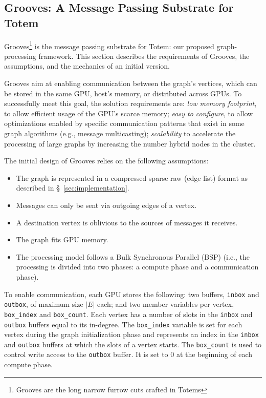 \subsection{Grooves: A Message Passing Substrate for Totem}
\label{sec:grooves}

{\sc Grooves}\footnote{Grooves are the long narrow furrow cuts crafted in Totems} is the message passing substrate for {\sc Totem}: our proposed graph-processing framework. This section describes the requirements of {\sc Grooves}, the assumptions, and the mechanics of an initial version. 

Grooves aim at enabling communication between the graph's vertices, which can be stored in the same GPU, host's memory, or distributed across GPUs. To successfully meet this goal, the solution requirements are: \emph{low memory footprint}, to allow efficient usage of the GPU's scarce memory; \emph{easy to configure}, to allow optimizations enabled by specific communication patterns that exist in some graph algorithms (e.g., message multicasting); {\em scalability} to accelerate the processing of large graphs by increasing the number hybrid nodes in the cluster.

The initial design of Grooves relies on the following assumptions: 
\begin{itemize}
\item The graph is represented in a compressed sparse raw (edge list) format as described in \S~\ref{sec:implementation}.
\item Messages can only be sent via outgoing edges of a vertex.
\item A destination vertex is oblivious to the sources of messages it receives.
\item The graph fits GPU memory.
\item The processing model follows a Bulk Synchronous Parallel (BSP) (i.e., the processing is divided into two phases: a compute phase and a communication phase).
\end{itemize}

To enable communication, each GPU stores the following: two buffers, \texttt{inbox} and \texttt{outbox}, of maximum size $|E|$ each; and two member variables per vertex, \texttt{box\_index} and \texttt{box\_count}. Each vertex has a number of slots in the \texttt{inbox} and \texttt{outbox} buffers equal to its in-degree. The \texttt{box\_index} variable is set for each vertex during the graph initialization phase and represents an index in the \texttt{inbox} and \texttt{outbox} buffers at which the slots of a vertex starts. The \texttt{box\_count} is used to control write access to the \texttt{outbox} buffer. It is set to 0 at the beginning of each compute phase. 

